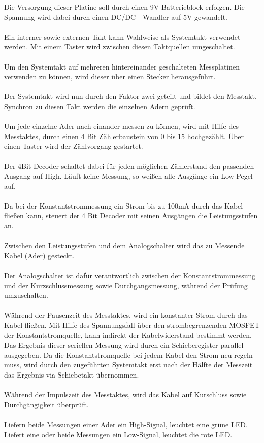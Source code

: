 Die Versorgung dieser Platine soll durch einen 9V Batterieblock erfolgen. Die Spannung wird dabei durch einen DC/DC - Wandler auf 5V gewandelt.
\\
\\
Ein interner sowie externen Takt kann Wahlweise als Systemtakt verwendet werden. Mit einem Taster wird zwischen diesen Taktquellen umgeschaltet.
\\
\\
Um den Systemtakt auf mehreren hintereinander geschalteten Messplatinen verwenden zu können, wird dieser über einen Stecker herausgeführt.
\\
\\
Der Systemtakt wird nun durch den Faktor zwei geteilt und bildet den Messtakt. Synchron zu diesen Takt werden die einzelnen Adern geprüft.
\\
\\
Um jede einzelne Ader nach einander messen zu können, wird mit Hilfe des Messtaktes, durch einen 4 Bit Zählerbaustein von 0 bis 15 hochgezählt. Über einen Taster wird der Zählvorgang gestartet.
\\
\\
Der 4Bit Decoder schaltet dabei für jeden möglichen Zählerstand den passenden Ausgang auf High. Läuft keine Messung, so weißen alle Ausgänge ein Low-Pegel auf. 
\\
\\
Da bei der Konstantstrommessung ein Strom bis zu 100mA durch das Kabel fließen kann, steuert der 4 Bit Decoder mit seinen Ausgängen die Leistungsstufen an.
\\
\\
Zwischen den Leistungsstufen und dem Analogschalter wird das zu Messende Kabel  (Ader) gesteckt. 
\\
\\
Der Analogschalter ist dafür verantwortlich zwischen der Konstantstrommessung und der Kurzschlussmessung sowie Durchgangsmessung, während der Prüfung umzuschalten. 
\\
\\
Während der Pausenzeit des Messtaktes, wird ein konstanter Strom durch das Kabel fließen. Mit Hilfe des Spannungsfall über den strombegrenzenden MOSFET der Konstantstromquelle, kann indirekt der Kabelwiderstand bestimmt werden. Das Ergebnis dieser seriellen Messung wird durch ein Schieberegister parallel ausgegeben. Da die Konstantstromquelle bei jedem Kabel den Strom neu regeln muss, wird durch den zugeführten Systemtakt erst nach der Hälfte der Messzeit das Ergebnis via Schiebetakt übernommen.
\\
\\
Während der Impulszeit des Messtaktes, wird das Kabel auf Kurschluss sowie Durchgängigkeit überprüft. 
\\
\\
Liefern beide Messungen einer Ader ein High-Signal, leuchtet eine grüne LED. Liefert eine oder beide Messungen ein Low-Signal, leuchtet die rote LED.

